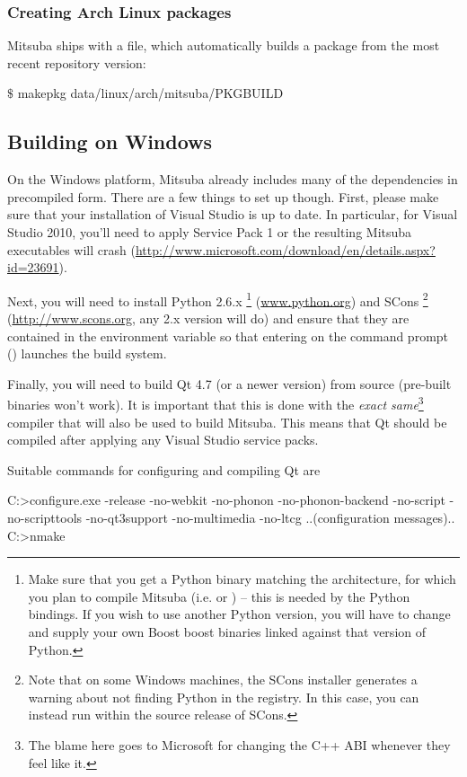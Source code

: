 \subsubsection{Creating Arch Linux packages}
Mitsuba ships with a  file, which automatically builds
a package from the most recent repository version:
\begin{shell}
$\text{\$}$ makepkg data/linux/arch/mitsuba/PKGBUILD
\end{shell}

\subsection{Building on Windows}
On the Windows platform, Mitsuba already includes many of the dependencies in precompiled form.
There are a few things to set up though. First, please make sure that your
installation of Visual Studio is up to date. In particular, for
Visual Studio 2010, you'll need to apply Service Pack 1
or the resulting Mitsuba executables will crash
(\url{http://www.microsoft.com/download/en/details.aspx?id=23691}).

Next, you will need to install Python 2.6.x \footnote{
Make sure that you get a Python binary matching the architecture, for which you plan to compile
Mitsuba (i.e.  or ) -- this is needed by the Python bindings. If you wish to
use another Python version, you will have to change  and supply your own Boost boost 
binaries linked against that version of Python.} 
(\url{www.python.org}) and SCons \footnote{Note that on some Windows machines, the SCons 
installer generates a warning about not finding Python in the registry. In this case, you 
can instead run  within the source release of SCons.} 
(\url{http://www.scons.org}, any 2.x version will do) and ensure that they are contained in the  
environment variable so that entering  on the command prompt () 
launches the build system.

Finally, you will need to build Qt 4.7 (or a newer version) from 
source (pre-built binaries won't work). It is important that this 
is done with the \emph{exact same}\footnote{The blame here goes to 
Microsoft for changing the C++ ABI whenever they feel like it.} 
compiler that will also be used  to build Mitsuba. This means that 
Qt should be compiled after applying any Visual Studio service packs.

Suitable commands for configuring and compiling Qt are
\begin{shell}
C:\Qt>configure.exe -release -no-webkit -no-phonon -no-phonon-backend -no-script
      -no-scripttools -no-qt3support -no-multimedia -no-ltcg
..(configuration messages)..
C:\Qt>nmake
\end{shell}

